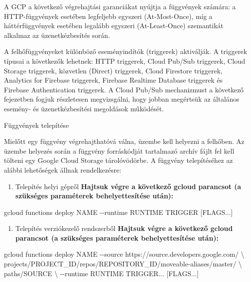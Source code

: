 \documentclass[
]{article}
\newenvironment{Shaded}{}{}
\newcommand{\AttributeTok}[1]{\textcolor[rgb]{0.49,0.56,0.16}{#1}}
\newcommand{\DataTypeTok}[1]{\textcolor[rgb]{0.56,0.13,0.00}{#1}}
\newcommand{\ExtensionTok}[1]{#1}
\newcommand{\NormalTok}[1]{#1}
\newcommand{\PreprocessorTok}[1]{\textcolor[rgb]{0.74,0.48,0.00}{#1}}
\newcommand{\SpecialStringTok}[1]{\textcolor[rgb]{0.73,0.40,0.53}{#1}}
\providecommand{\tightlist}{%
  \setlength{\itemsep}{0pt}\setlength{\parskip}{0pt}}
\begin{document}
A GCP a következő végrehajtási garanciákat nyújtja a függvények számára:
a HTTP-függvények esetében legfeljebb egyszeri (At-Most-Once), míg a
háttérfüggvények esetében legalább egyszeri (At-Least-Once) szemantikát
alkalmaz az üzenetkézbesítés során.

A felhőfüggvényeket különböző eseményindítók (triggerek) aktiválják. A
triggerek típusai a következők lehetnek: HTTP triggerek, Cloud Pub/Sub
triggerek, Cloud Storage triggerek, közvetlen (Direct) triggerek, Cloud
Firestore triggerek, Analytics for Firebase triggerek, Firebase Realtime
Database triggerek és Firebase Authentication triggerek. A Cloud Pub/Sub
mechanizmust a következő fejezetben fogjuk részletesen megvizsgálni,
hogy jobban megértsük az általános esemény- és üzenetkézbesítési
megoldások működését.

Függvények telepítése

Mielőtt egy függvény végrehajthatóvá válna, üzembe kell helyezni a
felhőben. Az üzembe helyezés során a függvény forráskódját tartalmazó
archív fájlt fel kell tölteni egy Google Cloud Storage tárolóvödörbe. A
függvény telepítéséhez az alábbi lehetőségek állnak rendelkezésre:

\begin{enumerate}
\def\labelenumi{\arabic{enumi}.}
\tightlist
\item
  Telepítés helyi gépről \textbf{Hajtsuk végre a következő gcloud
  parancsot (a szükséges paraméterek behelyettesítése után):}
\end{enumerate}

\begin{Shaded}
\begin{Highlighting}[]
\ExtensionTok{gcloud}\NormalTok{ functions deploy NAME }\AttributeTok{{-}{-}runtime}\NormalTok{ RUNTIME TRIGGER }\PreprocessorTok{[}\SpecialStringTok{FLAGS...}\PreprocessorTok{]}
\end{Highlighting}
\end{Shaded}

\begin{enumerate}
\def\labelenumi{\arabic{enumi}.}
\setcounter{enumi}{1}
\tightlist
\item
  Telepítés verziókezelő rendszerből \textbf{Hajtsuk végre a következő
  gcloud parancsot (a szükséges paraméterek behelyettesítése után):}
\end{enumerate}

\begin{Shaded}
\begin{Highlighting}[]
\ExtensionTok{gcloud}\NormalTok{ functions deploy NAME }\AttributeTok{{-}{-}source}\NormalTok{ https://source.developers.google.com/ }\DataTypeTok{\textbackslash{}}
\NormalTok{        projects/PROJECT\_ID/repos/REPOSITORY\_ID/moveable{-}aliases/master/ }\DataTypeTok{\textbackslash{}}
\NormalTok{        paths/SOURCE }\DataTypeTok{\textbackslash{}}
        \AttributeTok{{-}{-}runtime}\NormalTok{ RUNTIME TRIGGER... }\PreprocessorTok{[}\SpecialStringTok{FLAGS...}\PreprocessorTok{]}
\end{Highlighting}
\end{Shaded}
\end{document}
